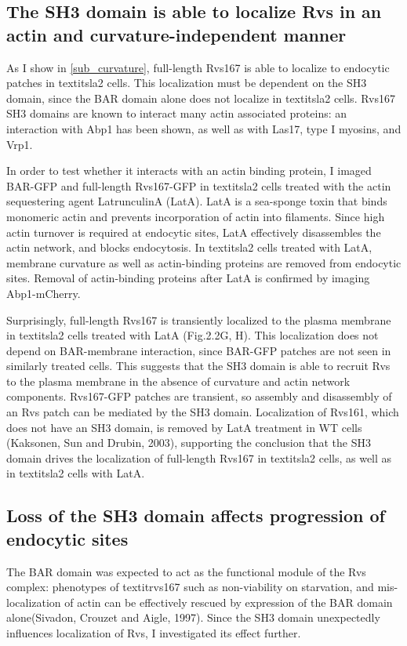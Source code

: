 	\subsection{The SH3 domain is able to localize Rvs in an actin and curvature-independent manner}
	\label{delsh3_latA}
As I show in \ref{sub_curvature}, full-length Rvs167 is able to localize to endocytic patches in textit{sla2\textDelta} cells. This localization must be dependent on the SH3 domain, since the BAR domain alone does not localize in textit{sla2\textDelta} cells. Rvs167 SH3 domains are known to interact many actin associated proteins: an interaction with Abp1 has been shown, as well as with Las17, type I myosins, and Vrp1. 

	\vspace{5mm}
	
In order to test whether it interacts with an actin binding protein, I imaged BAR-GFP and full-length Rvs167-GFP in textit{sla2\textDelta} cells treated with the actin sequestering agent LatrunculinA (LatA). LatA is a sea-sponge toxin that binds monomeric actin and prevents incorporation of actin into filaments. Since high actin turnover is required at endocytic sites, LatA effectively disassembles the actin network, and blocks endocytosis. In textit{sla2\textDelta} cells treated with LatA, membrane curvature as well as actin-binding proteins are removed from endocytic sites. Removal of actin-binding proteins after LatA is confirmed by imaging Abp1-mCherry.

	\vspace{5mm}
Surprisingly, full-length Rvs167 is transiently localized to the plasma membrane in textit{sla2\textDelta} cells treated with LatA (Fig.2.2G, H). This localization does not depend on BAR-membrane interaction, since BAR-GFP patches are not seen in similarly treated cells. This suggests that the SH3 domain is able to recruit Rvs to the plasma membrane in the absence of curvature and actin network components. Rvs167-GFP patches are transient, so assembly and disassembly of an Rvs patch can be mediated by the SH3 domain. Localization of Rvs161, which does not have an SH3 domain, is removed by LatA treatment in WT cells (Kaksonen, Sun and Drubin, 2003), supporting the conclusion that the SH3 domain drives the localization of full-length Rvs167 in textit{sla2\textDelta}  cells, as well as in textit{sla2\textDelta}  cells with LatA. 


	\subsection{Loss of the SH3 domain affects progression of \\endocytic sites}
	\label{delsh3_movement}
The BAR domain was expected to act as the functional module of the Rvs complex: phenotypes of textit{rvs167\textDelta}  such as non-viability on starvation, and mis-localization of actin can be effectively rescued by expression of the BAR domain alone(Sivadon, Crouzet and Aigle, 1997). Since the SH3 domain unexpectedly influences localization of Rvs, I investigated its effect further.

